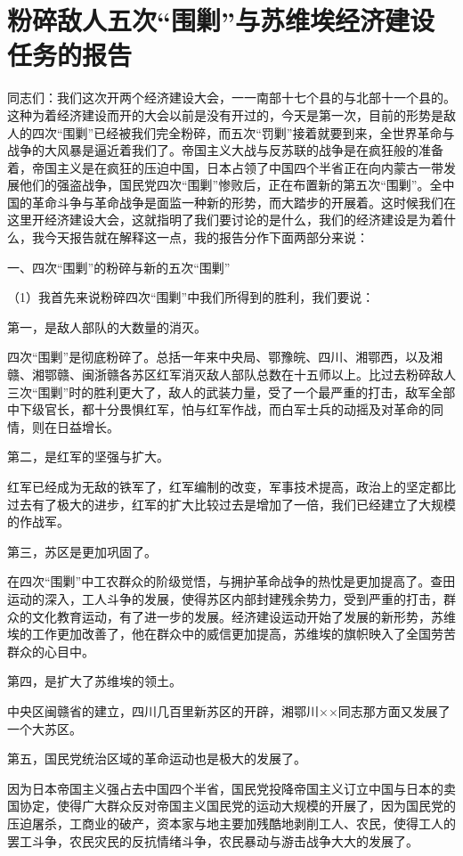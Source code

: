 \section[粉碎敌人五次“围剿”与苏维埃经济建设任务的报告（一九三三年八月二十日）]{粉碎敌人五次“围剿”与苏维埃经济建设任务的报告}


同志们：我们这次开两个经济建设大会，一一南部十七个县的与北部十一个县的。这种为着经济建设而开的大会以前是没有开过的，今天是第一次，目前的形势是敌人的四次“围剿”已经被我们完全粉碎，而五次“罚剿”接着就要到来，全世界革命与战争的大风暴是逼近着我们了。帝国主义大战与反苏联的战争是在疯狂般的准备着，帝国主义是在疯狂的压迫中国，日本占领了中国四个半省正在向内蒙古一带发展他们的强盗战争，国民党四次“围剿”惨败后，正在布置新的第五次“围剿”。全中国的革命斗争与革命战争是面监一种新的形势，而大踏步的开展着。这时候我们在这里开经济建设大会，这就指明了我们要讨论的是什么，我们的经济建设是为着什么，我今天报告就在解释这一点，我的报告分作下面两部分来说：

一、四次“围剿”的粉碎与新的五次“围剿”

（1）我首先来说粉碎四次“围剿”中我们所得到的胜利，我们要说：

第一，是敌人部队的大数量的消灭。

四次“围剿”是彻底粉碎了。总括一年来中央局、鄂豫皖、四川、湘鄂西，以及湘赣、湘鄂赣、闽浙赣各苏区红军消灭敌人部队总数在十五师以上。比过去粉碎敌人三次“围剿”时的胜利更大了，敌人的武装力量，受了一个最严重的打击，敌军全部中下级官长，都十分畏惧红军，怕与红军作战，而白军士兵的动摇及对革命的同情，则在日益增长。

第二，是红军的坚强与扩大。

红军已经成为无敌的铁军了，红军编制的改变，军事技术提高，政治上的坚定都比过去有了极大的进步，红军的扩大比较过去是增加了一倍，我们已经建立了大规模的作战军。

第三，苏区是更加巩固了。

在四次“围剿”中工农群众的阶级觉悟，与拥护革命战争的热忱是更加提高了。查田运动的深入，工人斗争的发展，使得苏区内部封建残余势力，受到严重的打击，群众的文化教育运动，有了进一步的发展。经济建设运动开始了发展的新形势，苏维埃的工作更加改善了，他在群众中的威信更加提高，苏维埃的旗帜映入了全国劳苦群众的心目中。

第四，是扩大了苏维埃的领土。

中央区闽赣省的建立，四川几百里新苏区的开辟，湘鄂川××同志那方面又发展了一个大苏区。

第五，国民党统治区域的革命运动也是极大的发展了。

因为日本帝国主义强占去中国四个半省，国民党投降帝国主义订立中国与日本的卖国协定，使得广大群众反对帝国主义国民党的运动大规模的开展了，因为国民党的压迫屠杀，工商业的破产，资本家与地主要加残酷地剥削工人、农民，使得工人的罢工斗争，农民灾民的反抗情绪斗争，农民暴动与游击战争大大的发展了。

